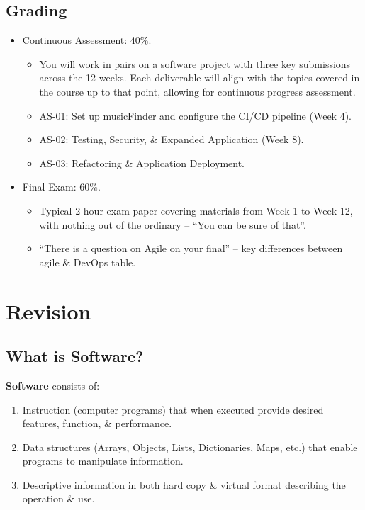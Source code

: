 \documentclass[a4paper,11pt]{article}
\begin{document}
\subsection{Grading}
\begin{itemize}
    \item   Continuous Assessment: 40\%.
            \begin{itemize}
                \item   You will work in pairs on a software project with three key submissions across the 12 weeks.
                        Each deliverable will align with the topics covered in the course up to that point, allowing 
                        for continuous progress assessment.
                \item   AS-01: Set up musicFinder and configure the CI/CD pipeline (Week 4).
                \item   AS-02: Testing, Security, \& Expanded Application (Week 8).
                \item   AS-03: Refactoring \& Application Deployment.
            \end{itemize}

    \item   Final Exam: 60\%.
            \begin{itemize}
                \item   Typical 2-hour exam paper covering materials from Week 1 to Week 12, with nothing out of the ordinary --
                        ``You can be sure of that''.
                    \item   ``There is a question on Agile on your final'' -- key differences between agile \& DevOps table.
            \end{itemize}
\end{itemize}

\section{Revision}
\subsection{What is Software?}
\textbf{Software} consists of:
\begin{enumerate}[label=\roman*.]
    \item   Instruction (computer programs) that when executed provide desired features, function, \& performance.
    \item   Data structures (Arrays, Objects, Lists, Dictionaries, Maps, etc.) that enable programs to manipulate information.
    \item   Descriptive information in both hard copy \& virtual format describing the operation \& use.
\end{enumerate}
\end{document}
